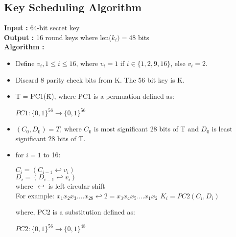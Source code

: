 \documentclass[11pt]{article}
\begin{document}
\subsection*{Key Scheduling Algorithm}
\textbf{Input : } 64-bit secret key\\
\textbf{Output : } 16 round keys where len($k_i) = 48 $ bits\\
\vspace{3mm}
\textbf{Algorithm :}
\begin{itemize}
    \item Define $v_i, 1 \leq i \leq 16$, where $v_i = 1$ if $i \in \{1, 2, 9, 16\}$, else $v_i = 2$. 
    \item Discard 8 parity check bits from K. The 56 bit key is \~{K}.
    \item T = PC1(\~{K}), where PC1 is a permuation defined as:
    \begin{center}
        $PC1: \{0, 1\}^{56} \rightarrow \{0, 1\}^{56}$\\
    \end{center}

    \item $(C_0, D_0) = T$, where $C_0$ is most significant 28 bits of T and $D_0$ is least significant 28 bits of T.

    \item for $i = 1$ to 16:
    \begin{center}
        $C_i = (C_{i-1} \hookleftarrow v_i)$\\
        $D_i = (D_{i-1} \hookleftarrow v_i)$\\
        where $\hookleftarrow$ is left circular shift\\
        For example: $x_1x_2x_3....x_28 \hookleftarrow 2 = x_3x_4x_5....x_1x_2 $
        $K_i = PC2(C_i, D_i)$\\
    \end{center}
    where, PC2 is a substitution defined as:
    \begin{center}
        $PC2: \{0, 1\}^{56} \rightarrow \{0, 1\}^{48}$\\
    \end{center}
\end{itemize}
\end{document}
